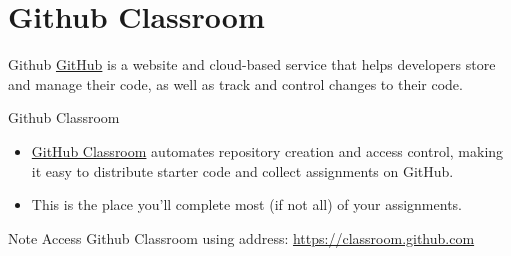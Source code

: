\documentclass[12pt,letterpaper]{beamer}
\begin{document}
\section{Github Classroom}
\begin{frame}{Github}
    \href{https://github.com}{GitHub} is a website and cloud-based service that helps developers store and manage their code, as well as track and control changes to their code. 
\end{frame}

\begin{frame}{Github Classroom}
\begin{itemize}
    \item \href{https://classroom.github.com}{GitHub Classroom} automates repository creation and access control, making it easy to distribute starter code and collect assignments on GitHub.
    \item This is the place you'll complete most (if not all) of your assignments.
\end{itemize}
\begin{alertblock}{Note}
    Access Github Classroom using address: \href{https://classroom.github.com}{https://classroom.github.com}
\end{alertblock}   

\end{frame}
\end{document}
